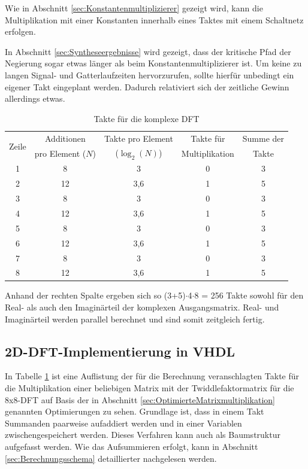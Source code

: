 Wie in Abschnitt \ref{sec:Konstantenmultiplizierer} gezeigt wird, kann die Multiplikation mit einer Konstanten innerhalb eines Taktes mit einem Schaltnetz erfolgen. 

In Abschnitt \ref{sec:Syntheseergebnisse} wird gezeigt, dass der kritische Pfad der Negierung sogar etwas länger als beim Konstantenmultiplizierer ist.
Um keine zu langen Signal- und Gatterlaufzeiten hervorzurufen, sollte hierfür unbedingt ein eigener Takt eingeplant werden. Dadurch relativiert sich der zeitliche Gewinn allerdings 
etwas. 


\begin{table}[ht!]
\centering
\caption{Takte für die komplexe DFT}
\label{tab:TakteKomplexeDFT}
\begin{tabular}{ccccc}
\hline
\multirow{2}{*}{Zeile} & Additionen & Takte pro Element & Takte für & Summe der\\
      & pro Element ($N$) & ($\log_2(N)$) & Multiplikation & Takte\\
\hline
 1& 8  & 3   &0 &3\\
 2& 12 & 3,6 &1 &5\\
 3& 8  & 3   &0 &3\\
 4& 12 & 3,6 &1 &5\\
 5& 8  & 3   &0 &3\\
 6& 12 & 3,6 &1 &5\\
 7& 8  & 3   &0 &3\\
 8& 12 & 3,6 &1 &5\\
\hline
\end{tabular}
\end{table}

Anhand der rechten Spalte ergeben sich so (3+5)$\cdot$4$\cdot$8 = 256 Takte sowohl für den Real- als auch den Imaginärteil der komplexen Ausgangsmatrix. Real- und Imaginärteil
werden parallel berechnet und sind somit zeitgleich fertig.


\subsection{2D-DFT-Implementierung in VHDL}

In Tabelle \ref{tab:TakteKomplexeDFT} ist eine Auflistung der für die Berechnung veranschlagten Takte für die Multiplikation einer beliebigen Matrix mit der
Twiddlefaktormatrix für die 8x8-DFT auf Basis der in Abschnitt \ref{sec:OptimierteMatrixmultiplikation} genannten Optimierungen zu sehen. Grundlage ist, dass in einem Takt Summanden 
paarweise aufaddiert werden und in einer Variablen zwischengespeichert werden. Dieses Verfahren kann auch als Baumstruktur aufgefasst werden. 
Wie das Aufsummieren erfolgt, kann in Abschnitt \ref{sec:Berechnungsschema} detaillierter nachgelesen werden.




